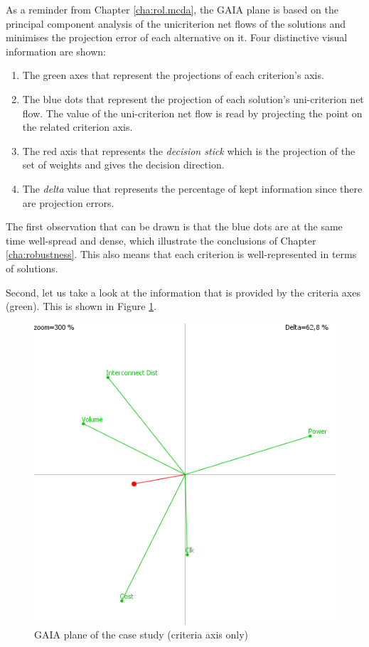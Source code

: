 As a reminder from Chapter \ref{cha:rol.mcda}, the GAIA plane is based on the principal component analysis of the unicriterion net flows of the solutions and minimises the projection error of each alternative on it. Four distinctive visual information are shown:
\begin{enumerate}
\item The green axes that represent the projections of each criterion's axis.
\item The blue dots that represent the projection of each solution's uni-criterion net flow. The value of the uni-criterion net flow is read by projecting the point on the related criterion axis.
\item The red axis that represents the \textit{decision stick} which is the projection of the set of weights and gives the decision direction.
\item The \textit{delta} value that represents the percentage of kept information since there are projection errors.
\end{enumerate}

The first observation that can be drawn is that the blue dots are at the same time well-spread and dense, which illustrate the conclusions of Chapter \ref{cha:robustness}. This also means that each criterion is well-represented in terms of solutions.

Second, let us take a look at the information that is provided by the criteria axes (green). This is shown in Figure \ref{fig:gva804crit}.

\begin{figure}[h!]
\begin{center}
\includegraphics[width=0.8\linewidth]{gva804crit}
\end{center}
\caption{GAIA plane of the case study (criteria axis only)}
\label{fig:gva804crit}
\end{figure}

